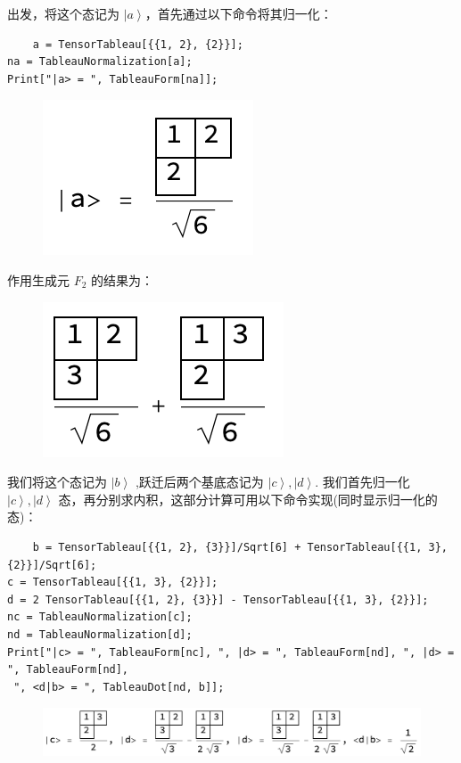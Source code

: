 \documentclass[UTF8]{ctexart}
\begin{document}
\noindent 出发，将这个态记为 $\left| a \right \rangle$，首先通过以下命令将其归一化：
\begin{verbatim}
	a = TensorTableau[{{1, 2}, {2}}];
na = TableauNormalization[a];
Print["|a> = ", TableauForm[na]];
\end{verbatim}

\begin{figure}[H]
\begin{centering}
\includegraphics[width=0.25\linewidth]{include/O5}
\par\end{centering}
\end{figure}

\noindent 作用生成元 $F_2$ 的结果为：

\begin{figure}[H]
\begin{centering}
\includegraphics[width=0.25\linewidth]{include/O6}
\par\end{centering}
\end{figure}

\noindent 我们将这个态记为 $\left| b \right \rangle$ ,跃迁后两个基底态记为 $\left| c \right \rangle,\left| d \right \rangle$. 我们首先归一化 $\left| c \right \rangle,\left| d \right \rangle$ 态，再分别求内积，这部分计算可用以下命令实现(同时显示归一化的态)：

\begin{verbatim}
	b = TensorTableau[{{1, 2}, {3}}]/Sqrt[6] + TensorTableau[{{1, 3}, {2}}]/Sqrt[6];
c = TensorTableau[{{1, 3}, {2}}];
d = 2 TensorTableau[{{1, 2}, {3}}] - TensorTableau[{{1, 3}, {2}}];
nc = TableauNormalization[c];
nd = TableauNormalization[d];
Print["|c> = ", TableauForm[nc], ", |d> = ", TableauForm[nd], ", |d> = ", TableauForm[nd],
 ", <d|b> = ", TableauDot[nd, b]];
\end{verbatim}

\begin{figure}[H]
\begin{centering}
\includegraphics[width=0.95\linewidth]{include/O7}
\par\end{centering}
\end{figure}
\end{document}
